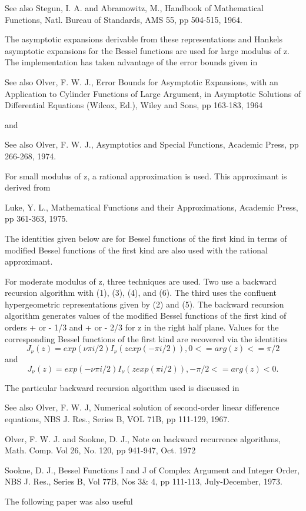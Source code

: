 \begin{DoxySeeAlso}{See also}
Stegun, I. A. and Abramowitz, M., Handbook of Mathematical Functions, Natl. Bureau of Standards, A\+M\+S 55, pp 504-\/515, 1964.
\end{DoxySeeAlso}
The asymptotic expansions derivable from these representations and Hankel\textquotesingle{}s asymptotic expansions for the Bessel functions are used for large modulus of z. The implementation has taken advantage of the error bounds given in

\begin{DoxySeeAlso}{See also}
Olver, F. W. J., Error Bounds for Asymptotic Expansions, with an Application to Cylinder Functions of Large Argument, in Asymptotic Solutions of Differential Equations (Wilcox, Ed.), Wiley and Sons, pp 163-\/183, 1964
\end{DoxySeeAlso}
and

\begin{DoxySeeAlso}{See also}
Olver, F. W. J., Asymptotics and Special Functions, Academic Press, pp 266-\/268, 1974.
\end{DoxySeeAlso}
For small modulus of z, a rational approximation is used. This approximant is derived from

Luke, Y. L., Mathematical Functions and their Approximations, Academic Press, pp 361-\/363, 1975.

The identities given below are for Bessel functions of the first kind in terms of modified Bessel functions of the first kind are also used with the rational approximant.

For moderate modulus of z, three techniques are used. Two use a backward recursion algorithm with (1), (3), (4), and (6). The third uses the confluent hypergeometric representations given by (2) and (5). The backward recursion algorithm generates values of the modified Bessel functions of the first kind of orders + or -\/ 1/3 and + or -\/ 2/3 for z in the right half plane. Values for the corresponding Bessel functions of the first kind are recovered via the identities \[ J_\nu(z) = exp(\nu \pi i/2) I_\nu(z exp(-\pi i/2)), 0 <= arg(z) <= \pi/2 \] and \[ J_\nu(z) = exp(-\nu \pi i/2) I_\nu(z exp(\pi i/2)), -\pi/2 <= arg(z) < 0 . \]

The particular backward recursion algorithm used is discussed in

\begin{DoxySeeAlso}{See also}
Olver, F. W. J, Numerical solution of second-\/order linear difference equations, N\+B\+S J. Res., Series B, V\+O\+L 71\+B, pp 111-\/129, 1967.

Olver, F. W. J. and Sookne, D. J., Note on backward recurrence algorithms, Math. Comp. Vol 26, No. 120, pp 941-\/947, Oct. 1972

Sookne, D. J., Bessel Functions I and J of Complex Argument and Integer Order, N\+B\+S J. Res., Series B, Vol 77\+B, Nos 3\& 4, pp 111-\/113, July-\/\+December, 1973.
\end{DoxySeeAlso}
The following paper was also useful

